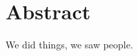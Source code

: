 \begingroup
\let\clearpage\relax
\let\cleardoublepage\relax
\let\cleardoublepage\relax

\chapter*{Abstract}
We did things, we saw people.
%
